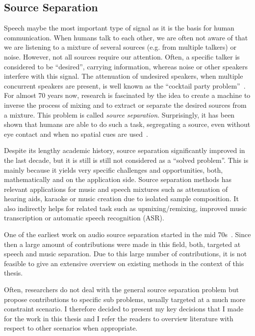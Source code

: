 \subsection{Source Separation}

Speech maybe the most important type of signal as it is the basis for human communication.
When humans talk to each other, we are often not aware of that we are listening to a mixture of several sources (e.g. from multiple talkers) or noise.
However, not all sources require our attention.
Often, a specific talker is considered to be ``desired'', carrying information, whereas noise or other speakers interfere with this signal.
The attenuation of undesired speakers, when multiple concurrent speakers are present, is well known as the ``cocktail party problem''~\cite{cherry53, haykin05}.
For almost 70 years now, research is fascinated by the idea to create a machine to inverse the process of mixing and to extract or separate the desired sources from a mixture.
This problem is called \emph{source separation}.
Surprisingly, it has been shown that humans are able to do such a task, segregating a  source, even without eye contact and when no spatial cues are used~\cite{bregman90}.

Despite its lengthy academic history, source separation significantly improved in the last decade, but it is still is still not considered as a ``solved problem''.
This is mainly because it yields very specific challenges and opportunities, both, mathematically and on the application side. 
Source separation methods has relevant applications for music and speech mixtures such as attenuation of hearing aids, karaoke or music creation due to isolated sample composition.
It also indirectly helps for related task such as upmixing/remixing, improved music transcription or automatic speech recognition (ASR). 
\par
One of the earliest work on audio source separation started in the mid 70s~\cite{miller73}.
Since then a large amount of contributions were made in this field, both, targeted at speech and music separation.
Due to this large number of contributions, it is not feasible to give an extensive overview on existing methods in the context of this thesis.

Often, researchers do not deal with the general source separation problem but propose contributions to specific sub problems, usually targeted at a much more constraint scenario.
I therefore decided to present my key decisions that I made for the work in this thesis and I refer the readers to overview literature with respect to other scenarios when appropriate.

